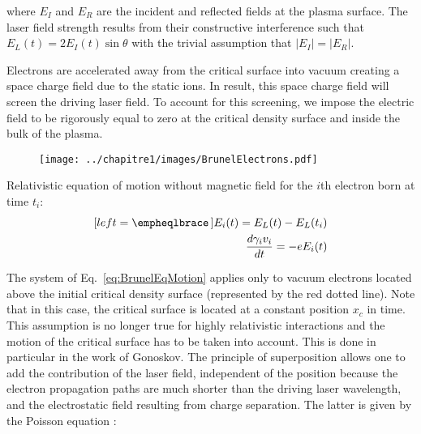 \noindent where $E_I$ and $E_R$ are the incident and reflected fields at the plasma surface. The laser field strength results from their constructive interference such that $E_L(t) = 2E_I(t)\sin\theta$ with the trivial assumption that $|E_I| = |E_R|$.


\noindent Electrons are accelerated away from the critical surface into vacuum creating a space charge field due to the static ions. In result, this space charge field will screen the driving laser field. To account for this screening, we impose the electric field to be rigorously equal to zero at the critical density surface and inside the bulk of the plasma.


\begin{minipage}{0.5\textwidth}
\begin{figure}[H]
\centering
\texttt{[image: ../chapitre1/images/BrunelElectrons.pdf]}\\
\end{figure}
\end{minipage} \hfill
\begin{minipage}{0.45\textwidth}
Relativistic equation of motion without magnetic field for the $i$th electron born at time $t_i$:
\begin{subequations}
\label{eq:BrunelEqMotion}
\begin{align}[left = \empheqlbrace\,]
   E_i(t) = E_L(t) - E_L(t_i) \\
   \frac{d\gamma_iv_i}{dt} = -eE_i(t)
\end{align}
\label{eq:BrunelEquationMotion}
\end{subequations}
\end{minipage}
\begin{minipage}{0.5\textwidth}
\end{minipage}

\noindent The system of Eq.~\ref{eq:BrunelEqMotion} applies only to vacuum electrons located above the initial critical density surface (represented by the red dotted line).  Note that in this case, the critical surface is located at a constant position $x_c$ in time. This assumption is no longer true for highly relativistic interactions \cite{TheseHenri} and the motion of the critical surface has to be taken into account. This is done in particular in the work of Gonoskov\cite{gonoskov2011ultrarelativistic}. The principle of superposition allows one to add the contribution of the laser field, independent of the position because the electron propagation paths are much shorter than the driving laser wavelength, and the electrostatic field resulting from charge separation. The latter is given by the Poisson equation :



